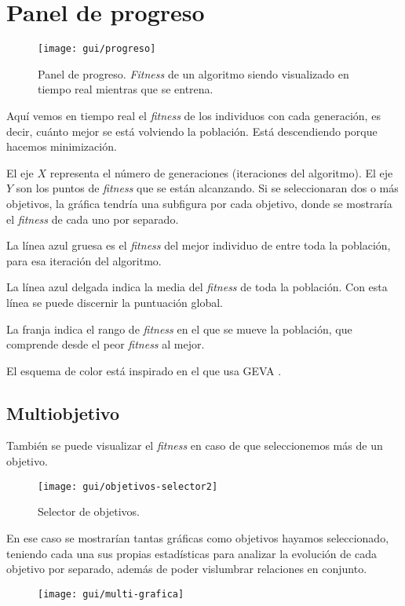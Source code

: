\section{Panel de progreso}
\begin{figure}[H]
\centering
\texttt{[image: gui/progreso]}
\caption{Panel de progreso. \textit{Fitness} de un algoritmo siendo visualizado en tiempo real mientras que se entrena.}
\end{figure}

Aquí vemos en tiempo real el \textit{fitness} de los individuos con cada generación, es decir, cuánto mejor se está volviendo la población. Está descendiendo porque hacemos minimización.

El eje $X$ representa el número de generaciones (iteraciones del algoritmo). El eje $Y$ son los puntos de \textit{fitness} que se están alcanzando. Si se seleccionaran dos o más objetivos, la gráfica tendría una subfigura por cada objetivo, donde se mostraría el \textit{fitness} de cada uno por separado.

La línea azul gruesa es el \textit{fitness} del mejor individuo de entre toda la población, para esa iteración del algoritmo.

La línea azul delgada indica la media del \textit{fitness} de toda la población. Con esta línea se puede discernir la puntuación global.

La franja indica el rango de \textit{fitness} en el que se mueve la población, que comprende desde el peor \textit{fitness} al mejor.

El esquema de color está inspirado en el que usa GEVA \cite{gevaGit}.

\subsection{Multiobjetivo}
También se puede visualizar el \textit{fitness} en caso de que seleccionemos más de un objetivo.
\begin{figure}[H]
\centering
\texttt{[image: gui/objetivos-selector2]}
\caption{Selector de objetivos.}
\end{figure}

En ese caso se mostrarían tantas gráficas como objetivos hayamos seleccionado, teniendo cada una sus propias estadísticas para analizar la evolución de cada objetivo por separado, además de poder vislumbrar relaciones en conjunto.
\begin{figure}[H]
\centering
\texttt{[image: gui/multi-grafica]}
\end{figure}


